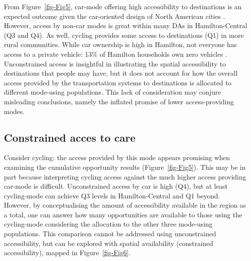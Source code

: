 \documentclass[
  authoryear,
  preprint,
  3p]{elsarticle}
\begin{document}
From Figure~\ref{fig-Fig5}, car-mode offering high accessibility to
destinations is an expected outcome given the car-oriented design of
North American cities \citep{saeidizandRevisitingCarDependency2022}.
However, access by non-car modes is great within many DAs in
Hamilton-Central (Q3 and Q4). As well, cycling provides some access to
destinations (Q1) in more rural communities. While car ownership is high
in Hamilton, not everyone has access to a private vehicle: 13\% of
Hamilton households own zero vehicles
\citep{datamanagementgroupTTSTransportationTomorrow2018}. Unconstrained
access is insightful in illustrating the spatial accessibility to
destinations that people may have, but it does not account for how the
overall access provided by the transportation systems to destinations is
allocated to different mode-using populations. This lack of
consideration may conjure misleading conclusions, namely the inflated
promise of lower access-providing modes.

\hypertarget{constrained-acces-to-care}{%
\subsection{Constrained acces to care}\label{constrained-acces-to-care}}

Consider cycling: the access provided by this mode appears promising
when examining the cumulative opportunity results
(Figure~\ref{fig-Fig5}). This may be in part because interpreting
cycling access against the much higher access providing car-mode is
difficult. Unconstrained access by car is high (Q4), but at least
cycling-mode can achieve Q3 levels in Hamilton-Central and Q1 beyond.
However, by conceptualising the amount of accessibility available in the
region as a total, one can answer how many opportunities are available
to those using the cycling-mode considering the allocation to the other
three mode-using populations. This comparison cannot be addressed using
unconstrained accessibility, but can be explored with spatial
availability (constrained accessibility), mapped in
Figure~\ref{fig-Fig6}.
\end{document}
